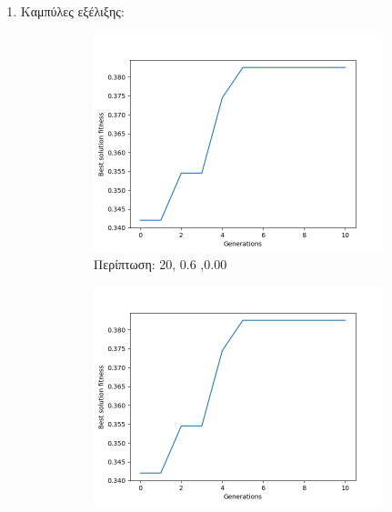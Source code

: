 \documentclass[12pt,a4paper]{article}
\begin{document}
\begin{enumerate}
            \item Καμπύλες εξέλιξης:
                \newpage
                \begin{figure}[H]
                     \centering
                     \begin{subfigure}[h]{0.7\textwidth}
                         \centering
                         \includegraphics[width=\textwidth]{images/1.png}
                         \caption*{Περίπτωση: 20, 0.6 ,0.00}
                     \end{subfigure}
                     \hfill
                     \begin{subfigure}[h]{0.7\textwidth}
                         \centering
                         \includegraphics[width=\textwidth]{images/2.png}

\end{subfigure}
\end{figure}
\end{enumerate}
\end{document}
